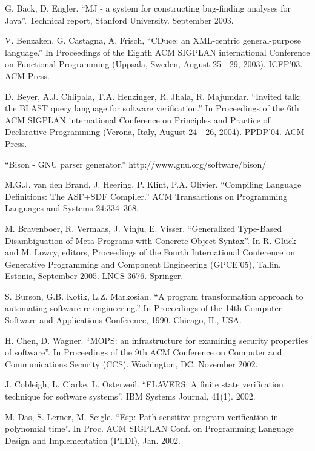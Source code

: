 \documentclass{sigplanconf}
\begin{document}
\begin{thebibliography}{10}

 G. Back, D. Engler. ``MJ - a system for constructing
bug-finding analyses for Java''. Technical report, Stanford
University. September 2003.

 V. Benzaken, G. Castagna, A. Frisch, ``CDuce: an
XML-centric general-purpose language.'' In Proceedings of the Eighth
ACM SIGPLAN international Conference on Functional Programming
(Uppsala, Sweden, August 25 - 29, 2003). ICFP'03. ACM Press.

 D. Beyer, A.J. Chlipala, T.A. Henzinger, R. Jhala,
R. Majumdar. ``Invited talk: the BLAST query language for software
verification.'' In Proceedings of the 6th ACM SIGPLAN international
Conference on Principles and Practice of Declarative Programming
(Verona, Italy, August 24 - 26, 2004). PPDP'04. ACM Press.

 ``Bison - GNU parser generator.''
http://www.gnu.org/software/bison/

 M.G.J. van den Brand, J. Heering, P. Klint,
P.A. Olivier. ``Compiling Language Definitions: The ASF+SDF
Compiler.'' ACM Transactions on Programming Languages and Systems
24:334--368.

 M. Bravenboer, R. Vermaas, J. Vinju,
E. Visser. ``Generalized Type-Based Disambiguation of Meta Programs
with Concrete Object Syntax''. In R. Glück and M. Lowry, editors,
Proceedings of the Fourth International Conference on Generative
Programming and Component Engineering (GPCE'05), Tallin, Estonia,
September 2005. LNCS 3676. Springer.

 S. Burson, G.B. Kotik, L.Z. Markosian.  ``A program
transformation approach to automating software re-engineering.'' In
Proceedings of the 14th Computer Software and Applications Conference,
1990. Chicago, IL, USA.

 H. Chen, D. Wagner. ``MOPS: an infrastructure for
examining security properties of software''. In Proceedings of the 9th
ACM Conference on Computer and Communications Security
(CCS). Washington, DC. November 2002.

 J. Cobleigh, L. Clarke, L. Osterweil. ``FLAVERS: A
finite state verification technique for software systems''. IBM
Systems Journal, 41(1). 2002.

 M. Das, S. Lerner, M. Seigle. ``Esp: Path-sensitive
program verification in polynomial time''. In Proc. ACM SIGPLAN
Conf. on Programming Language Design and Implementation (PLDI),
Jan. 2002.


\end{thebibliography}
\end{document}
